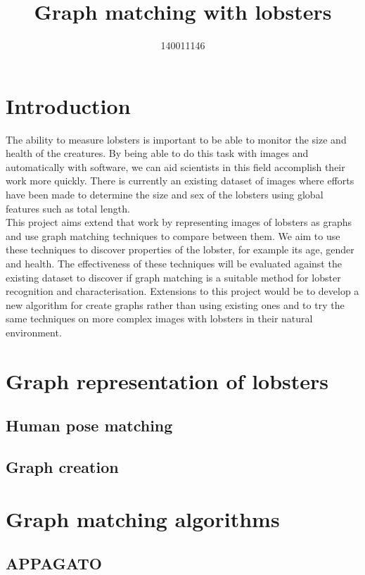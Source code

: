 \documentclass{article}
\title{Graph matching with lobsters}
\author{140011146}
\newcommand{\n}[0]{\\[\baselineskip]}
\begin{document}
\maketitle

\tableofcontents

\section{Introduction}
The ability to measure lobsters is important to be able to monitor the size and health of the creatures. By being able to do this task with images and automatically with software, we can aid scientists in this field accomplish their work more quickly. There is currently an existing dataset of images where efforts have been made to determine the size and sex of the lobsters using global features such as total length.
\n
This project aims extend that work by representing images of lobsters as graphs and use graph matching techniques to compare between them. We aim to use these techniques to discover properties of the lobster, for example its age, gender and health. The effectiveness of these techniques will be evaluated against the existing dataset to discover if graph matching is a suitable method for lobster recognition and characterisation. Extensions to this project would be to develop a new algorithm for create graphs rather than using existing ones and to try the same techniques on more complex images with lobsters in their natural environment.


\section{Graph representation of lobsters}

\subsection{Human pose matching}

\subsection{Graph creation}

\section{Graph matching algorithms}

\subsection{APPAGATO}
\end{document}
